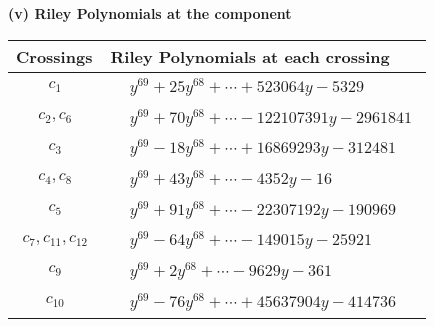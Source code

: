 \documentclass[1p]{elsarticle_modified}
\theoremstyle{definition}
\begin{document}
\newpage\renewcommand{\arraystretch}{1}
\flushleft \textbf{(v) Riley Polynomials at the component}\newline \\
\begin{tabular}{m{50pt}|m{274pt}}
Crossings & \hspace{64pt}Riley Polynomials at each crossing \\
\hline $$\begin{aligned}c_{1}\end{aligned}$$&$\begin{aligned}
&y^{69}+25 y^{68}+\cdots+523064 y-5329
\end{aligned}$\\
\hline $$\begin{aligned}c_{2},c_{6}\end{aligned}$$&$\begin{aligned}
&y^{69}+70 y^{68}+\cdots-122107391 y-2961841
\end{aligned}$\\
\hline $$\begin{aligned}c_{3}\end{aligned}$$&$\begin{aligned}
&y^{69}-18 y^{68}+\cdots+16869293 y-312481
\end{aligned}$\\
\hline $$\begin{aligned}c_{4},c_{8}\end{aligned}$$&$\begin{aligned}
&y^{69}+43 y^{68}+\cdots-4352 y-16
\end{aligned}$\\
\hline $$\begin{aligned}c_{5}\end{aligned}$$&$\begin{aligned}
&y^{69}+91 y^{68}+\cdots-22307192 y-190969
\end{aligned}$\\
\hline $$\begin{aligned}c_{7},c_{11},c_{12}\end{aligned}$$&$\begin{aligned}
&y^{69}-64 y^{68}+\cdots-149015 y-25921
\end{aligned}$\\
\hline $$\begin{aligned}c_{9}\end{aligned}$$&$\begin{aligned}
&y^{69}+2 y^{68}+\cdots-9629 y-361
\end{aligned}$\\
\hline $$\begin{aligned}c_{10}\end{aligned}$$&$\begin{aligned}
&y^{69}-76 y^{68}+\cdots+45637904 y-414736
\end{aligned}$\\
\hline
\end{tabular}\\~\\
\end{document}
